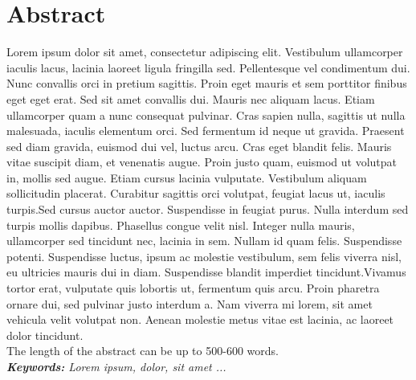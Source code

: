 \section*{\Large \sffamily Abstract}
Lorem ipsum dolor sit amet, consectetur adipiscing elit. Vestibulum ullamcorper iaculis lacus, lacinia laoreet ligula fringilla sed. Pellentesque vel condimentum dui. Nunc convallis orci in pretium sagittis. Proin eget mauris et sem porttitor finibus eget eget erat. Sed sit amet convallis dui. Mauris nec aliquam lacus. Etiam ullamcorper quam a nunc consequat pulvinar. Cras sapien nulla, sagittis ut nulla malesuada, iaculis elementum orci. Sed fermentum id neque ut gravida. Praesent sed diam gravida, euismod dui vel, luctus arcu. Cras eget blandit felis. Mauris vitae suscipit diam, et venenatis augue. Proin justo quam, euismod ut volutpat in, mollis sed augue. Etiam cursus lacinia vulputate. Vestibulum aliquam sollicitudin placerat. Curabitur sagittis orci volutpat, feugiat lacus ut, iaculis turpis.Sed cursus auctor auctor. Suspendisse in feugiat purus. Nulla interdum sed turpis mollis dapibus. Phasellus congue velit nisl. Integer nulla mauris, ullamcorper sed tincidunt nec, lacinia in sem. Nullam id quam felis. Suspendisse potenti. Suspendisse luctus, ipsum ac molestie vestibulum, sem felis viverra nisl, eu ultricies mauris dui in diam. Suspendisse blandit imperdiet tincidunt.Vivamus tortor erat, vulputate quis lobortis ut, fermentum quis arcu. Proin pharetra ornare dui, sed pulvinar justo interdum a. Nam viverra mi lorem, sit amet vehicula velit volutpat non. Aenean molestie metus vitae est lacinia, ac laoreet dolor tincidunt.\\

The length of the abstract can be up to 500-600 words.\\

\textit{\textbf{Keywords:} Lorem ipsum, dolor, sit amet ...}
